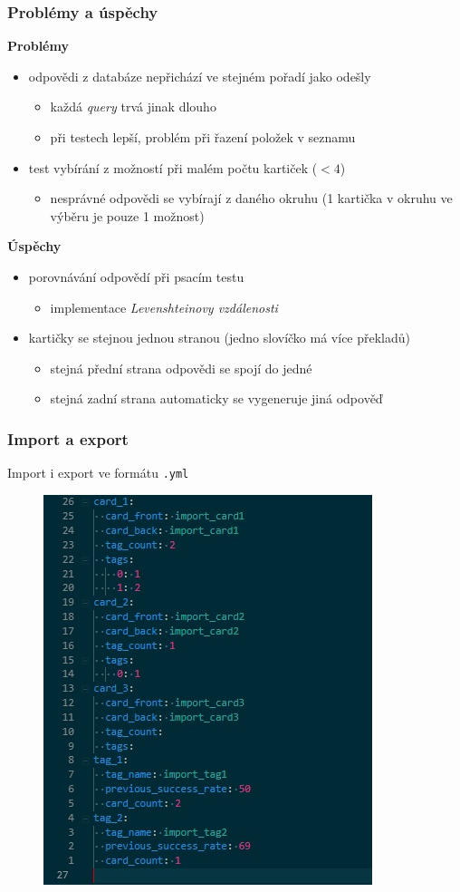 \documentclass[9pt]{beamer}
\begin{document}
    \begin{frame}
        \frametitle{Problémy a úspěchy}
        \textbf{Problémy}
        \begin{itemize}
            \item odpovědi z databáze nepřichází ve stejném pořadí jako odešly
            \begin{itemize}
                \item každá \textit{query} trvá jinak dlouho
                \item při testech lepší, problém při řazení položek v seznamu
            \end{itemize}
            \item test vybírání z možností při malém počtu kartiček ($< 4$)
            \begin{itemize}
                \item nesprávné odpovědi se vybírají z daného okruhu (1 kartička v okruhu  ve výběru je pouze 1 možnost)
            \end{itemize}
        \end{itemize}
        \textbf{Úspěchy}
        \begin{itemize}
            \item porovnávání odpovědí při psacím testu
            \begin{itemize}
                \item implementace \textit{Levenshteinovy vzdálenosti}
            \end{itemize}
            \item kartičky se stejnou jednou stranou (jedno slovíčko má více překladů)
            \begin{itemize}
                \item stejná přední strana  odpovědi se spojí do jedné
                \item stejná zadní strana  automaticky se vygeneruje jiná odpověď
            \end{itemize}
        \end{itemize}
    \end{frame}
    \begin{frame}
        \frametitle{Import a export}
        Import i export ve formátu \texttt{.yml}
        \begin{figure}
            \centering
            \includegraphics[width=0.5\linewidth]{yml_example.jpg}
        \end{figure}
    \end{frame}
\end{document}
